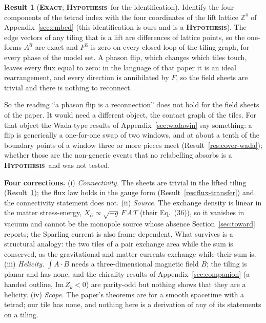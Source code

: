 \documentclass[11pt]{article}
\newcommand{\exact}{\textbf{\textsc{Exact}}}
\newcommand{\hypo}{\textbf{\textsc{Hypothesis}}}
\theoremstyle{definition}
\newtheorem{result}{Result}
\begin{document}
\begin{result}[\exact; \hypo\ for the identification]\label{res:lift-flux}
Identify the four components of the tetrad index with the four coordinates of the lift lattice $\mathbb{Z}^4$ of Appendix~\ref{sec:embed} (this identification is ours and is a \hypo). The edge vectors of any tiling that is a lift are differences of lattice points, so the one-forms $A^{\hat\alpha}$ are exact and $F^{\hat\alpha}$ is zero on every closed loop of the tiling graph, for every phase of the model set. A phason flip, which changes which tiles touch, leaves every flux equal to zero: in the language of that paper it is an ideal rearrangement, and every direction is annihilated by $F$, so the field sheets are trivial and there is nothing to reconnect.
\end{result}
So the reading ``a phason flip is a reconnection'' does not hold for the field sheets of the paper. It would need a different object, the contact graph of the tiles. For that object the Wada-type results of Appendix~\ref{sec:wadawin} say something: a flip is generically a one-for-one swap of two windows, and at about a tenth of the boundary points of a window three or more pieces meet (Result~\ref{res:cover-wada}); whether those are the non-generic events that no relabelling absorbs is a \hypo\ and was not tested.

\textbf{Four corrections.} (i) \emph{Connectivity.} The sheets are trivial in the lifted tiling (Result~\ref{res:lift-flux}); the flux law holds in the gauge form (Result~\ref{res:flux-transfer}) and the connectivity statement does not. (ii) \emph{Source.} The exchange density is linear in the matter stress-energy, $X_{\hat\alpha}\propto\sqrt{-g}\,F\,A\,T$ (their Eq.~(36)), so it vanishes in vacuum and cannot be the monopole source whose absence Section~\ref{sec:toward} reports; the Sparling current is also frame dependent. What survives is a structural analogy: the two tiles of a pair exchange area while the sum is conserved, as the gravitational and matter currents exchange while their sum is. (iii) \emph{Helicity.} $\int A\cdot B$ needs a three-dimensional magnetic field $B$; the tiling is planar and has none, and the chirality results of Appendix~\ref{sec:companion} (a handed outline, $\mathrm{Im}\,Z_k<0$) are parity-odd but nothing shows that they are a helicity. (iv) \emph{Scope.} The paper's theorems are for a smooth spacetime with a tetrad; our tile has none, and nothing here is a derivation of any of its statements on a tiling.

\end{document}
